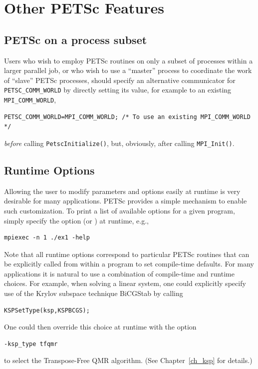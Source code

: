 {{{%
\cleardoublepage
\chapter{Other PETSc Features}

\section{PETSc on a process subset}

Users who wish to employ PETSc routines on only a subset
of processes within a larger parallel job, or who wish to use a
``master'' process to coordinate the work of ``slave'' PETSc
processes, should specify an alternative communicator for \lstinline{PETSC_COMM_WORLD} by directly setting its value, for example to an existing \lstinline{MPI_COMM_WORLD},
\begin{lstlisting}
PETSC_COMM_WORLD=MPI_COMM_WORLD; /* To use an existing MPI_COMM_WORLD */
\end{lstlisting}
{\em before} calling \lstinline{PetscInitialize()}, but, obviously, after
calling \lstinline{MPI_Init()}.

\section{Runtime Options}  
\label{sec_options}

Allowing the user to modify parameters and options easily at runtime
is very desirable for many applications.  PETSc provides a simple
mechanism to enable such customization.  To print a list of
available options for a given program, simply specify the option
 (or ) at runtime, e.g.,  
\begin{lstlisting}
mpiexec -n 1 ./ex1 -help
\end{lstlisting}

Note that all runtime options correspond to particular PETSc routines
that can be explicitly called from within a program to set compile-time
defaults.   For many applications it is natural to use a combination
of compile-time and runtime choices.  For example, when solving a linear
system, one could explicitly specify use of the Krylov subspace
technique BiCGStab by calling
\begin{lstlisting}
KSPSetType(ksp,KSPBCGS);
\end{lstlisting}
One could then override this choice at runtime with the option
\begin{lstlisting}
-ksp_type tfqmr
\end{lstlisting}
to select the Transpose-Free QMR algorithm. (See Chapter~\ref{ch_ksp} for details.)

}}}

